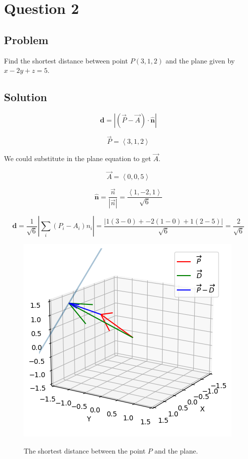 \documentclass[12pt]{article}
\begin{document}
\section{Question 2}

\subsection{Problem}

Find the shortest distance between point \(P(3, 1, 2)\) and the plane given by
\(x - 2y + z = 5\).

\subsection{Solution}

\[\boldsymbol{d}=|(\vec{P}-\vec{A}) \cdot \widehat{\boldsymbol{n}}|\]

\[
    \vec{P} = \left\langle3, 1, 2\right\rangle
\]

We could substitute in the plane equation to get \(\vec{A}\).

\[
    \vec{A} = \left\langle 0, 0, 5\right\rangle
\]

\[
    \widehat{\boldsymbol{n}} = \frac{\vec{n}}{\left\lvert \vec{n} \right\rvert }
    = \frac{\left\langle 1, -2, 1\right\rangle}{\sqrt{6}}
\]

\[
    \boldsymbol{d} = \frac{1}{\sqrt{6}}\left\lvert \sum_i {(P_i - A_i)n_i}\right\rvert
    = \frac{\left\lvert 1(3 - 0) + -2(1 - 0) + 1(2 - 5)\right\rvert }{\sqrt{6}}
    = \frac{2}{\sqrt{6}}
\]

\begin{figure}[H]
    \includegraphics[width=\linewidth]{Q2.png}\label{fig:Q2}
    \caption{The shortest distance between the point \(P\) and the
    plane.\cite{El-Deeb_PEU-218_Assignments_py}}
\end{figure}
\end{document}
